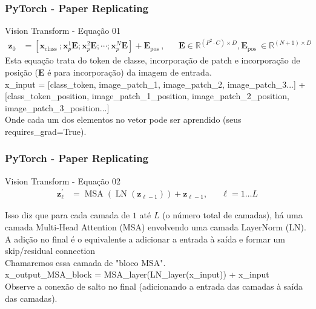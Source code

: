 \documentclass{beamer}
\begin{document}
\begin{frame}
	\frametitle{PyTorch - Paper Replicating}
	\begin{block}{Vision Transform - Equação 01}
		$$
		\begin{aligned}
			\mathbf{z}_{0} &=\left[\mathbf{x}_{\text {class }} ; \mathbf{x}_{p}^{1} \mathbf{E} ; \mathbf{x}_{p}^{2} \mathbf{E} ; \cdots ; \mathbf{x}_{p}^{N} \mathbf{E}\right]+\mathbf{E}_{\text {pos }}, & & \mathbf{E} \in \mathbb{R}^{\left(P^{2} \cdot C\right) \times D}, \mathbf{E}_{\text {pos }} \in \mathbb{R}^{(N+1) \times D}
		\end{aligned}
		$$
		Esta equação trata do token de classe, incorporação de patch e incorporação de posição ($\mathbf{E}$ é para incorporação) da imagem de entrada. \\
		x\_input = [class\_token, image\_patch\_1, image\_patch\_2, image\_patch\_3...] + [class\_token\_position, image\_patch\_1\_position, image\_patch\_2\_position, image\_patch\_3\_position...] \\
		Onde cada um dos elementos no vetor pode ser aprendido (seus requires\_grad=True).
	\end{block}
\end{frame}
\begin{frame}
	\frametitle{PyTorch - Paper Replicating}
	\begin{block}{Vision Transform - Equação 02}
		$$
		\begin{aligned}
			\mathbf{z}_{\ell}^{\prime} &=\operatorname{MSA}\left(\operatorname{LN}\left(\mathbf{z}_{\ell-1}\right)\right)+\mathbf{z}_{\ell-1}, & & \ell=1 \ldots L
		\end{aligned}
		$$

		Isso diz que para cada camada de $1$ até $L$ (o número total de camadas), há uma camada Multi-Head Attention (MSA) envolvendo uma camada LayerNorm (LN). \\
		A adição no final é o equivalente a adicionar a entrada à saída e formar um skip/residual connection \href{https://paperswithcode.com/method/residual-connection}{} \\
		Chamaremos essa camada de "bloco MSA". \\
		
		x\_output\_MSA\_block = MSA\_layer(LN\_layer(x\_input)) + x\_input \\ 
		Observe a conexão de salto no final (adicionando a entrada das camadas à saída das camadas).
	\end{block}
\end{frame}
\end{document}

